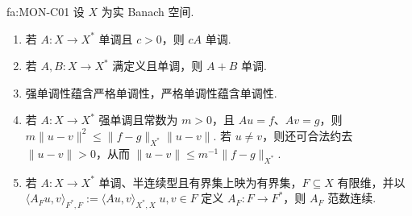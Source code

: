 \begin{FALemma}[C][单调性闭合工具与有限维限制连续性]{fa:MON-C01}
设 \(\displaystyle X\) 为实 Banach 空间.
\begin{enumerate}
\item 若 \(\displaystyle A:X\to X^*\) 单调且 \(\displaystyle c>0\)，则 \(\displaystyle cA\) 单调.
\item 若 \(\displaystyle A,B:X\to X^*\) 满定义且单调，则 \(\displaystyle A+B\) 单调.
\item 强单调性蕴含严格单调性，严格单调性蕴含单调性.
\item 若 \(\displaystyle A:X\to X^*\) 强单调且常数为 \(\displaystyle m>0\)，且 \(\displaystyle Au=f\)、\(\displaystyle Av=g\)，则
\(\displaystyle m\|u-v\|^2 \leqslant \|f-g\|_{X^*}\|u-v\|.\)
若 \(\displaystyle u\neq v\)，则还可合法约去 \(\displaystyle\|u-v\|>0\)，从而
\(\displaystyle \|u-v\| \leqslant m^{-1}\|f-g\|_{X^*}.\)
\item 若 \(\displaystyle A:X\to X^*\) 单调、半连续型且有界集上映为有界集，\(\displaystyle F\subseteq X\) 有限维，并以
\(\displaystyle \langle A_Fu,v\rangle_{F^*,F} := \langle Au,v\rangle_{X^*,X} \; u,v\in F\)
定义 \(\displaystyle A_F:F\to F^*\)，则 \(\displaystyle A_F\) 范数连续.
\end{enumerate}
\end{FALemma}


